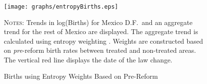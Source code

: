 \documentclass[a4paper,11pt]{article}
\begin{document}
\begin{spacing}{1.5}
\begin{figure}[htpb!]
  \begin{center}
    \caption{Births using Entropy Weights Based on Pre-Reform}
    \texttt{[image: graphs/entropyBirths.eps]}
    \label{fig:entropyBirth}
  \end{center}
  \textsc{Notes:} Trends in log(Births) for Mexico D.F.\ and an
  aggregate trend for the rest of Mexico are displayed.  The aggregate
  trend is calculated using entropy weighting \citep{Hainmueller2012}.
  Weights are constructed based on \emph{pre}-reform birth rates
  between treated and non-treated areas.  The vertical red line
  displays the date of the law change.
\end{figure}


\clearpage

\vspace{2cm}





\end{spacing}
\end{document}
